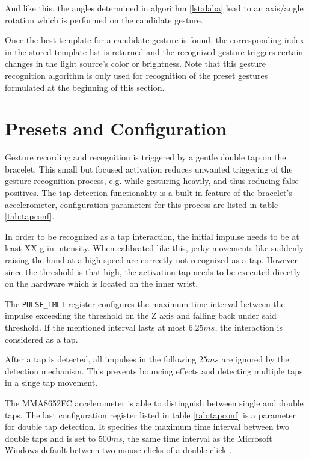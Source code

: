 And like this, the angles determined in algorithm \ref{lst:daba} lead to an axis/angle rotation which is performed on the candidate gesture.

Once the best template for a candidate gesture is found, the corresponding index in the stored template list is returned and the recognized gesture triggers certain changes in the light source's color or brightness. Note that this gesture recognition algorithm is only used for recognition of the preset gestures formulated at the beginning of this section.


\section{Presets and Configuration}
\label{sec:config}
Gesture recording and recognition is triggered by a gentle double tap on the bracelet. This small but focused activation reduces unwanted triggering of the gesture recognition process, e.g. while gesturing heavily, and thus reducing false positives. The tap detection functionality is a built-in feature of the bracelet's accelerometer, configuration parameters for this process are listed in table \ref{tab:tapconf}.

In order to be recognized as a tap interaction, the initial impulse needs to be at least XX g in intensity. When calibrated like this, jerky movements like suddenly raising the hand at a high speed are correctly not recognized as a tap. However since the threshold is that high, the activation tap needs to be executed directly on the hardware which is located on the inner wrist.

The \texttt{PULSE\_TMLT} register configures the maximum time interval between the  impulse exceeding the threshold on the Z axis and falling back under said threshold. If the mentioned interval lasts at most $6.25 ms$, the interaction is considered as a tap.

After a tap is detected, all impulses in the following $25ms$ are ignored by the detection mechanism. This prevents bouncing effects and detecting multiple taps in a singe tap movement.

The MMA8652FC accelerometer is able to distinguish between single and double taps. The last configuration register listed in table \ref{tab:tapconf} is a parameter for double tap detection. It specifies the maximum time interval between two double taps and is set to $500 ms$, the same time interval as the Microsoft Windows default between two mouse clicks of a double click \cite{doubleclick}.

